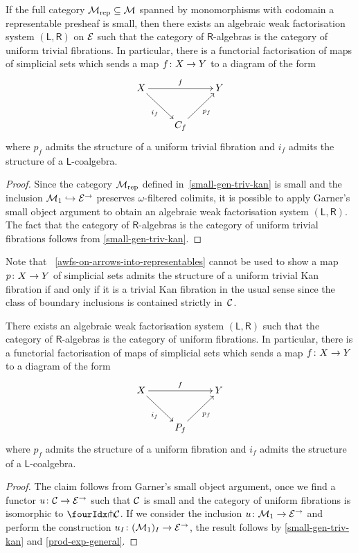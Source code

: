 \documentclass[reqno,10pt,a4paper,oneside]{amsart}
\begin{document}
\begin{corollary} If the full category $\cal{M}_{\textup{rep}} \subseteq \cal{M}$  spanned by 
 monomorphisms with codomain a representable
presheaf is small, then there exists an algebraic weak factorisation system $(\mathsf{L}, \mathsf{R})$ on
$\cal{E}$ such that the category of $\mathsf{R}$-algebras is the category of uniform trivial  fibrations. 
In particular, there is a functorial factorisation of maps of simplicial sets which sends
a map $f \co X \to Y$ to a diagram of the form
\[
\xymatrix{ 
X \ar[rr]^f \ar[dr]_{i_f}  & & Y \\
 & C_f \ar[ur]_{p_f} }
 \]
 where $p_f$ admits the structure of  a uniform trivial  fibration and 
 $i_f$ admits the structure of a $\mathsf{L}$-coalgebra.
\end{corollary}

\begin{proof} Since the category $\cal{M}_{\textup{rep}}$ defined in~\cref{small-gen-triv-kan} is small and
the inclusion $\cal{M}_1 \hookrightarrow \catE^\to$ preserves $\omega$-filtered colimits, 
it is possible to apply Garner's small object argument to
obtain an algebraic weak factorisation system $(\mathsf{L}, \mathsf{R})$.
The fact that the category of $\mathsf{R}$-algebras is the category of uniform trivial fibrations
 follows from \cref{small-gen-triv-kan}.
 \end{proof} 

Note that ~\cref{awfs-on-arrows-into-representables} cannot be used to show 
a map $p \co X \to Y$ of simplicial sets admits the structure of a uniform trivial Kan  fibration if and only if it is a trivial Kan fibration in the usual sense since  the class of boundary inclusions  is contained strictly  in~$\cal{C}$. 

\begin{corollary} There exists an algebraic weak factorisation system $(\mathsf{L}, \mathsf{R})$
such that the category of $\mathsf{R}$-algebras is the category of uniform  fibrations. 
In particular, there is a functorial factorisation of maps of simplicial sets which sends
a map $f \co X \to Y$ to a diagram of the form
\[
\xymatrix{ 
X \ar[rr]^f \ar[dr]_{i_f}  & & Y \\
 & P_f \ar[ur]_{p_f} }
 \]
 where $p_f$ admits the structure of  a uniform  fibration and 
 $i_f$ admits the structure of a $\mathsf{L}$-coalgebra.
\end{corollary} 

\begin{proof} The claim follows from Garner's small object argument, once we find a 
functor $u \co \cal{C} \rightarrow \catE^\to$ such that $\cal{C}$ is small and the
category of uniform  fibrations is isomorphic to $\liftr{\cal{C}}$. If we consider
the inclusion $u \co \mathcal{M}_1 \to \cal{E}^\to$ and perform the construction
$u_\interval \co (\mathcal{M}_1)_\interval \to \catE^\to$, the result follows 
by \cref{small-gen-triv-kan} and \cref{prod-exp-general}. 
\end{proof}
\end{document}
